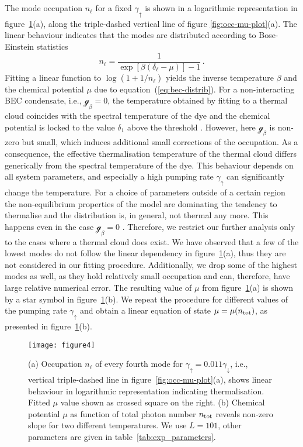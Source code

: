 \documentclass[12pt, a4paper]{iopart}
\begin{document}
The mode occupation $n_\ell^{}$ for a fixed $\gamma_\uparrow$ is shown in a logarithmic representation in figure~\ref{fig:occ-mu-plot-part2}(a), along the triple-dashed vertical line of figure \ref{fig:occ-mu-plot}(a). The linear behaviour indicates that the modes are distributed according to Bose-Einstein statistics
\begin{equation}
\label{eq:bec-distrib}
n_\ell^{} = \frac{1}{\exp[\beta(\delta_\ell - \mu)]-1} \, .
\end{equation}
Fitting a linear function to $\log \left(1 + 1 / n_\ell^{}\right)$ yields the inverse temperature $\beta$ and the chemical potential $\mu$ due to equation~(\ref{eq:bec-distrib}). For a non-interacting BEC condensate, i.e., $\mathcal{g}_\beta = 0$, the temperature obtained by fitting to a thermal cloud coincides with the spectral temperature of the dye and the chemical potential is locked to the value $\delta_1$ above the threshold \cite{Keeling_PRL-nonequilibrium_model_photon-cond}. However, here $\mathcal{g}_\beta$ is non-zero but small, which induces additional small corrections of the occupation. As a consequence, the effective thermalisation temperature of the thermal cloud differs generically from the spectral temperature of the dye. This behaviour depends on all system parameters, and especially a high pumping rate $\gamma_\uparrow$ can significantly change the temperature. For a choice of parameters outside of a certain region the non-equilibrium properties of the model are dominating the tendency to thermalise and the distribution is, in general, not thermal any more. This happens even in the case $\mathcal{g}_\beta = 0$ \cite{Keeling-Thermalization_photon_condensate}. Therefore, we restrict our further analysis only to the cases where a thermal cloud does exist. We have observed that a few of the lowest modes do not follow the linear dependency in figure~\ref{fig:occ-mu-plot-part2}(a), thus they are not considered in our fitting procedure. Additionally, we drop some of the highest modes as well, as they hold relatively small occupation and can, therefore, have large relative numerical error. The resulting value of $\mu$ from figure~\ref{fig:occ-mu-plot-part2}(a) is shown by a star symbol in figure~\ref{fig:occ-mu-plot-part2}(b). We repeat the procedure for different values of the pumping rate $\gamma_\uparrow$ and obtain a linear equation of state $\mu=\mu(n_{\rm tot})$, as presented in figure~\ref{fig:occ-mu-plot-part2}(b).

\begin{figure}[!t]
\centering
\texttt{[image: figure4]}
\caption{ (a) Occupation $n_\ell^{}$ of every fourth mode for $\gamma_\uparrow = 0.011\gamma_\downarrow$, i.e., vertical triple-dashed line in figure~\ref{fig:occ-mu-plot}(a), shows linear behaviour in logarithmic representation indicating thermalisation. Fitted $\mu$ value shown as crossed square on the right. (b) Chemical potential $\mu$ as function of total photon number $n_{\rm tot}$  reveals non-zero slope for two different temperatures. We use $L=101$, other parameters are given in table~\ref{tab:exp_parameters}.}
\label{fig:occ-mu-plot-part2}
\end{figure}
\end{document}
